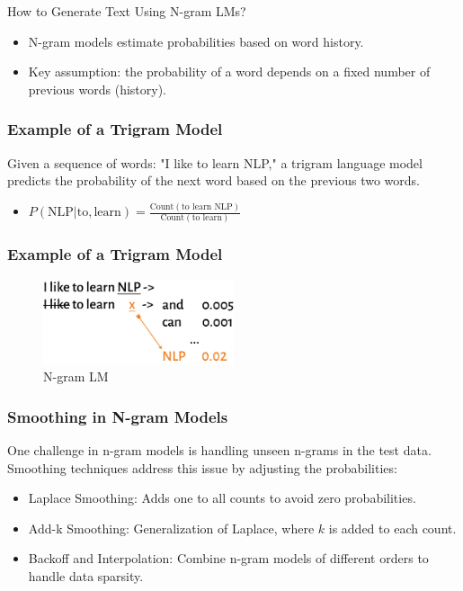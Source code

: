 \documentclass{beamer}
\begin{document}
\begin{frame}{How to Generate Text Using N-gram LMs?}
    \begin{itemize}
        \item N-gram models estimate probabilities based on word history.
        \item Key assumption: the probability of a word depends on a fixed number of previous words (history).
    \end{itemize}
\end{frame}

\begin{frame}
\frametitle{Example of a Trigram Model}
Given a sequence of words: "I like to learn NLP," a trigram language model predicts the probability of the next word based on the previous two words.
\begin{itemize}
    \item \( P(\text{NLP} | \text{to}, \text{learn}) = \frac{\text{Count}(\text{to learn NLP})}{\text{Count}(\text{to learn})} \)
\end{itemize}
\end{frame}

\begin{frame}
\frametitle{Example of a Trigram Model}
\begin{figure}
    \centering
    \includegraphics[width=0.5\textwidth,keepaspectratio]{images/n-gram_lm}
    \caption{N-gram LM}
    \label{fig:n-gram_lm}
\end{figure}

\end{frame}

\begin{frame}
\frametitle{Smoothing in N-gram Models}
One challenge in n-gram models is handling unseen n-grams in the test data. Smoothing techniques address this issue by adjusting the probabilities:
\begin{itemize}
    \item Laplace Smoothing: Adds one to all counts to avoid zero probabilities.
    \item Add-k Smoothing: Generalization of Laplace, where \( k \) is added to each count.
    \item Backoff and Interpolation: Combine n-gram models of different orders to handle data sparsity.
\end{itemize}
\end{frame}
\end{document}
